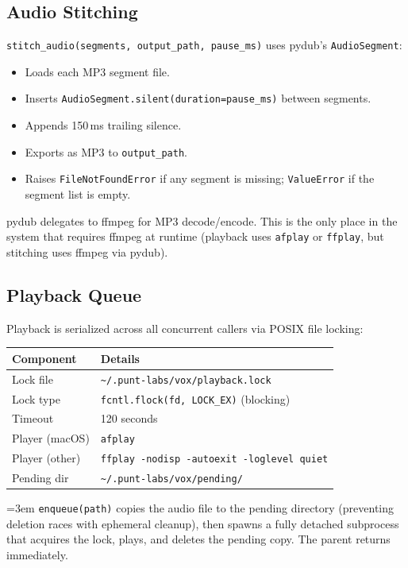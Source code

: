 \documentclass[a4paper,10pt]{article}
\newcommand{\field}[1]{\texttt{#1}}
\begin{document}
\subsection{Audio Stitching}

\texttt{stitch\_audio(segments, output\_path, pause\_ms)} uses
pydub's \texttt{AudioSegment}:

\begin{itemize}
  \item Loads each MP3 segment file.
  \item Inserts \texttt{AudioSegment.silent(duration=pause\_ms)}
    between segments.
  \item Appends 150\,ms trailing silence.
  \item Exports as MP3 to \field{output\_path}.
  \item Raises \texttt{FileNotFoundError} if any segment is
    missing; \texttt{ValueError} if the segment list is empty.
\end{itemize}

pydub delegates to ffmpeg for MP3 decode/encode.  This is the only
place in the system that requires ffmpeg at runtime (playback uses
\texttt{afplay} or \texttt{ffplay}, but stitching uses ffmpeg
via pydub).

\subsection{Playback Queue}

Playback is serialized across all concurrent callers via POSIX
file locking:

\begin{center}
\begin{tabular}{lp{8cm}}
\toprule
\textbf{Component} & \textbf{Details} \\
\midrule
Lock file      & \texttt{\~{}/.punt-labs/vox/playback.lock} \\
Lock type      & \texttt{fcntl.flock(fd, LOCK\_EX)} (blocking) \\
Timeout        & 120 seconds \\
Player (macOS) & \texttt{afplay} \\
Player (other) & \texttt{ffplay -nodisp -autoexit -loglevel quiet} \\
Pending dir    & \texttt{\~{}/.punt-labs/vox/pending/} \\
\bottomrule
\end{tabular}
\end{center}

{\emergencystretch=3em\relax
\texttt{enqueue(path)} copies the audio file to the pending
directory (preventing deletion races with ephemeral cleanup), then
spawns a fully detached subprocess that acquires the lock, plays,
and deletes the pending copy.  The parent returns immediately.\par}
\end{document}

